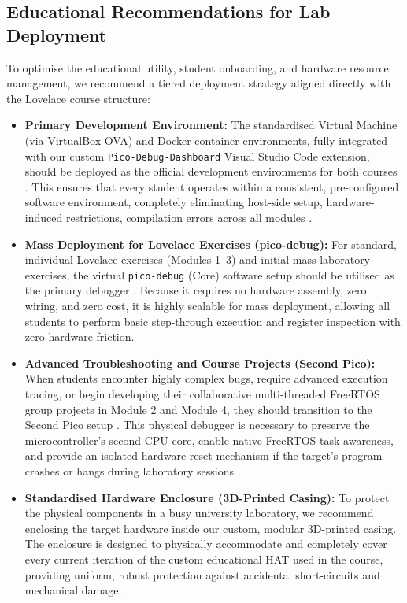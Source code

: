 \subsection{Educational Recommendations for Lab Deployment}
To optimise the educational utility, student onboarding, and hardware resource management, we recommend a tiered deployment strategy aligned directly with the Lovelace course structure:
\begin{itemize}
    \item \textbf{Primary Development Environment:} The standardised Virtual Machine (via VirtualBox OVA) and Docker container environments, fully integrated with our custom \texttt{Pico-Debug-Dashboard} Visual Studio Code extension, should be deployed as the official development environments for both courses \cite{pico_debug_dashboard}. This ensures that every student operates within a consistent, pre-configured software environment, completely eliminating host-side setup, hardware-induced restrictions, compilation errors across all modules \cite{kelhala:2024}.
    
    \item \textbf{Mass Deployment for Lovelace Exercises (pico-debug):} For standard, individual Lovelace exercises (Modules 1--3) and initial mass laboratory exercises, the virtual \texttt{pico-debug} (Core) software setup should be utilised as the primary debugger \cite{pico_debug}. Because it requires no hardware assembly, zero wiring, and zero cost, it is highly scalable for mass deployment, allowing all students to perform basic step-through execution and register inspection with zero hardware friction.
    
    \item \textbf{Advanced Troubleshooting and Course Projects (Second Pico):} When students encounter highly complex bugs, require advanced execution tracing, or begin developing their collaborative multi-threaded FreeRTOS group projects in Module 2 and Module 4, they should transition to the Second Pico setup \cite{pico_getting_started}. This physical debugger is necessary to preserve the microcontroller's second CPU core, enable native FreeRTOS task-awareness, and provide an isolated hardware reset mechanism if the target's program crashes or hangs during laboratory sessions \cite{pico_getting_started}.
    \item \textbf{Standardised Hardware Enclosure (3D-Printed Casing):} To protect the physical components in a busy university laboratory, we recommend enclosing the target hardware inside our custom, modular 3D-printed casing. The enclosure is designed to physically accommodate and completely cover every current iteration of the custom educational HAT used in the course, providing uniform, robust protection against accidental short-circuits and mechanical damage. 
\end{itemize}

